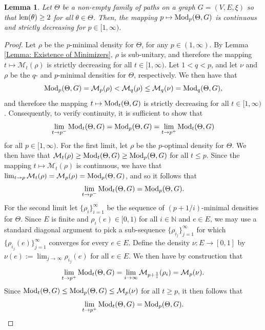 \documentclass{amsart}
\newcommand{\len}{{\rm len}}
\newcommand{\Mod}{{\rm Mod}}
\newtheorem{lemma}[equation]{Lemma}
\numberwithin{equation}{section}
\theoremstyle{definition}
\theoremstyle{remark}
\newcommand{\N}{\mathbb{N}}
\newcommand{\cM}{\mathcal{M}}
\begin{document}
\begin{lemma}\label{Lemma: Continuity of modulus}
    Let \(\Theta\) be a non-empty family of paths on a graph \(G=(V,E,\xi)\) so that \(\len(\theta)\geq 2\) for all \(\theta\in\Theta\). Then, the mapping \(p\mapsto \Mod_p(\Theta,G)\) is continuous and strictly decreasing for \(p\in[1,\infty)\).
\end{lemma}

\begin{proof}
    Let \(\rho\) be the \(p\)-minimal density for \(\Theta\), for any \(p\in(1,\infty)\). By Lemma \ref{Lemma: Existence of Minimizers}, \(\rho\) is sub-unitary, and therefore the mapping \(t\mapsto\cM_t(\rho)\) is strictly decreasing for all \(t\in[1,\infty)\). Let \(1<q<p\), and let \(\nu\) and \(\rho\) be the \(q\)- and \(p\)-minimal densities for \(\Theta\), respectively. We then have that
        \[
        \Mod_p(\Theta,G)=\cM_p(\rho)<\cM_q(\rho)\leq \cM_q(\nu)=\Mod_q(\Theta,G),
        \]
    and therefore the mapping \(t\mapsto \Mod_t(\Theta,G)\) is strictly decreasing for all \(t\in [1,\infty)\). Consequently, to verify continuity, it is sufficient to show that
        \[
            \lim_{t\to p^-}\Mod_t(\Theta,G)=\Mod_{p}(\Theta,G)=\lim_{t\to p^+}\Mod_t(\Theta,G)
        \]
    for all \(p\in[1,\infty)\). For the first limit, let \(\rho\) be the \(p\)-optimal density for \(\Theta\). We then have that \(\cM_t(\rho)\geq \Mod_t(\Theta,G)\geq \Mod_p(\Theta,G)\) for all \(t\leq p\). Since the mapping \(t\mapsto \cM_t(\rho)\) is continuous, we have that \(\lim_{t\to p}\cM_t(\rho)=\cM_p(\rho)=\Mod_p(\Theta,G)\), and so it follows that
        \[
            \lim_{t\to p^-}\Mod_t(\Theta,G)=\Mod_p(\Theta,G).
        \]
    For the second limit let \(\{\rho_i\}_{i=1}^\infty\) be the sequence of \((p+1/i)\)-minimal densities for \(\Theta\). Since \(E\) is finite and \(\rho_i(e)\in[0,1)\) for all \(i\in\N\) and \(e\in E\), we may use a standard diagonal argument to pick a sub-sequence \(\{\rho_{i_j}\}_{j=1}^\infty\) for which \(\{\rho_{i_j}(e)\}_{j=1}^\infty\) converges for every \(e\in E\). Define the density \(\nu\colon E\to [0,1]\) by \(\nu(e):=\lim_{j\to\infty}\rho_{i_j}(e)\) for all \(e\in E\). We then have by construction that
        \[
            \lim_{t\to p^+}\Mod_t(\Theta,G)=\lim_{i\to\infty}\cM_{p+\frac{1}{i}}(\rho_i)=\cM_p(\nu).
        \]
    Since \(\Mod_t(\Theta,G)\leq \Mod_p(\Theta,G)\leq \cM_p(\nu)\) for all \(t\geq p\), it then follows that
        \[
            \lim_{t\to p^+}\Mod_t(\Theta,G)=\Mod_p(\Theta,G).
        \]
\end{proof}
\end{document}
